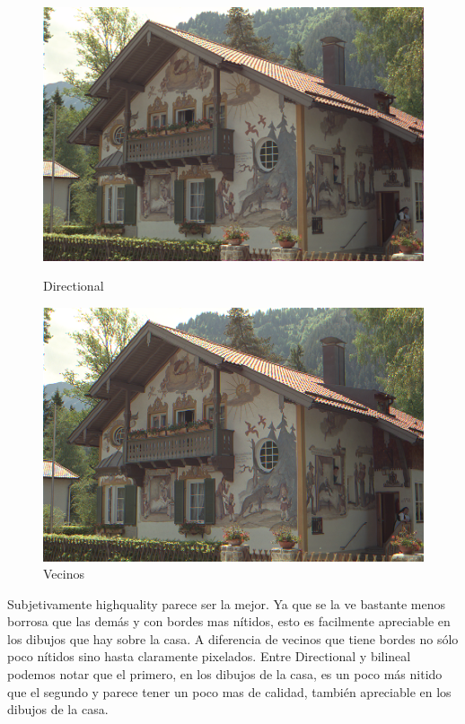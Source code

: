 {\begin{figure}[h]
\begin{center}
    \includegraphics[scale=0.3]{imagenes/img12_demosicing_spline.png}
    \caption{Directional}
        \end{center}
\endminipage
{}
\begin{center}
    \includegraphics[scale=0.3]{imagenes/img12_demosicing_vecino.png}
    \caption{Vecinos}
 \end{center}
\endminipage
 
\end{figure}
\newpage

Subjetivamente highquality parece ser la mejor. Ya que se la ve bastante menos borrosa que las demás y con bordes mas nítidos, esto es facilmente apreciable en los dibujos que hay sobre la casa. A diferencia de vecinos que tiene bordes no sólo poco nítidos sino hasta claramente pixelados. Entre Directional y bilineal podemos notar que el primero, en los dibujos de la casa, es un poco más nitido que el segundo y parece tener un poco mas de calidad, también apreciable en los dibujos de la casa.

}
